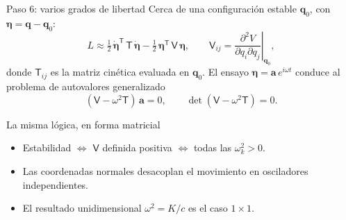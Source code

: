 \documentclass[11pt]{beamer}
\begin{document}
\begin{frame}{Paso 6: varios grados de libertad}
\small
Cerca de una configuración estable $\mathbf q_0$, con $\boldsymbol\eta=\mathbf q-\mathbf q_0$:
\[
L\approx\tfrac12\,\dot{\boldsymbol\eta}^{\mathsf T}\,\mathsf T\,\dot{\boldsymbol\eta}-\tfrac12\,\boldsymbol\eta^{\mathsf T}\,\mathsf V\,\boldsymbol\eta,
\qquad
\mathsf V_{ij}=\left.\frac{\partial^2V}{\partial q_i\partial q_j}\right|_{\mathbf q_0},
\]
donde $\mathsf T_{ij}$ es la matriz cinética evaluada en $\mathbf q_0$. El ensayo $\boldsymbol\eta=\mathbf a\,e^{i\omega t}$ conduce al problema de autovalores generalizado
\[
(\mathsf V-\omega^2\mathsf T)\,\mathbf a=0,\qquad \det(\mathsf V-\omega^2\mathsf T)=0 .
\]
\begin{block}{La misma lógica, en forma matricial}
\footnotesize
\begin{itemize}
  \item Estabilidad $\Leftrightarrow$ $\mathsf V$ definida positiva $\Leftrightarrow$ todas las $\omega_k^2>0$.
  \item Las coordenadas normales desacoplan el movimiento en osciladores independientes.
  \item El resultado unidimensional $\omega^2=K/c$ es el caso $1\times1$.
\end{itemize}
\end{block}
\end{frame}
\end{document}

